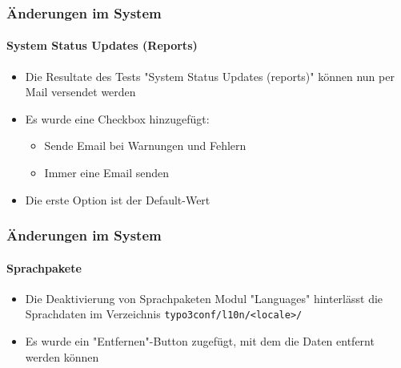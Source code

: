 \begin{frame}[fragile]
	\frametitle{Änderungen im System}
	\framesubtitle{System Status Updates (Reports)}

	\begin{itemize}
		\item Die Resultate des Tests "System Status Updates (reports)" können nun per Mail versendet werden
		\item Es wurde eine Checkbox hinzugefügt:

			\begin{itemize}
				\item Sende Email bei Warnungen und Fehlern
				\item Immer eine Email senden
			\end{itemize}

		\item Die erste Option ist der Default-Wert

	\end{itemize}

\end{frame}







\begin{frame}[fragile]
	\frametitle{Änderungen im System}
	\framesubtitle{Sprachpakete}

	\begin{itemize}
		\item Die Deaktivierung von Sprachpaketen Modul "Languages" hinterlässt die Sprachdaten im Verzeichnis
			\texttt{typo3conf/l10n/<locale>/}
		\item Es wurde ein "Entfernen"-Button zugefügt, mit dem die Daten entfernt werden können
	\end{itemize}

\end{frame}









